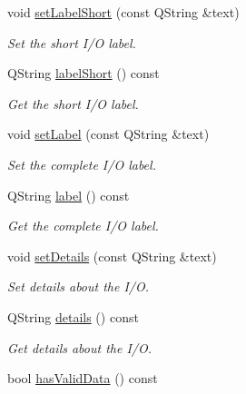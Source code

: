 \begin{DoxyCompactItemize}
void \hyperlink{classmdt_abstract_io_a0f0a70927942f793ce93c7f0c013a39e}{setLabelShort} (const QString \&text)
\begin{DoxyCompactList}\small\item\em Set the short I/O label. \end{DoxyCompactList}\item 
\hypertarget{classmdt_abstract_io_ad6490f8dda6df55cc3d1811348d0155e}{
QString \hyperlink{classmdt_abstract_io_ad6490f8dda6df55cc3d1811348d0155e}{labelShort} () const }
\label{classmdt_abstract_io_ad6490f8dda6df55cc3d1811348d0155e}

\begin{DoxyCompactList}\small\item\em Get the short I/O label. \end{DoxyCompactList}\item 
void \hyperlink{classmdt_abstract_io_ae614f78829c59cb7b7d8265dd59e2164}{setLabel} (const QString \&text)
\begin{DoxyCompactList}\small\item\em Set the complete I/O label. \end{DoxyCompactList}\item 
\hypertarget{classmdt_abstract_io_a8d21d147ce526f9ad9f65bde7c68b7d9}{
QString \hyperlink{classmdt_abstract_io_a8d21d147ce526f9ad9f65bde7c68b7d9}{label} () const }
\label{classmdt_abstract_io_a8d21d147ce526f9ad9f65bde7c68b7d9}

\begin{DoxyCompactList}\small\item\em Get the complete I/O label. \end{DoxyCompactList}\item 
\hypertarget{classmdt_abstract_io_a9844c14b0e64858c62604039681ab885}{
void \hyperlink{classmdt_abstract_io_a9844c14b0e64858c62604039681ab885}{setDetails} (const QString \&text)}
\label{classmdt_abstract_io_a9844c14b0e64858c62604039681ab885}

\begin{DoxyCompactList}\small\item\em Set details about the I/O. \end{DoxyCompactList}\item 
\hypertarget{classmdt_abstract_io_a6e0b36f1563a045a23417145290fdf41}{
QString \hyperlink{classmdt_abstract_io_a6e0b36f1563a045a23417145290fdf41}{details} () const }
\label{classmdt_abstract_io_a6e0b36f1563a045a23417145290fdf41}

\begin{DoxyCompactList}\small\item\em Get details about the I/O. \end{DoxyCompactList}\item 
\hypertarget{classmdt_abstract_io_a61d96045087fe92a0b455693970b1e76}{
bool \hyperlink{classmdt_abstract_io_a61d96045087fe92a0b455693970b1e76}{hasValidData} () const }
\label{classmdt_abstract_io_a61d96045087fe92a0b455693970b1e76}


\end{DoxyCompactItemize}

